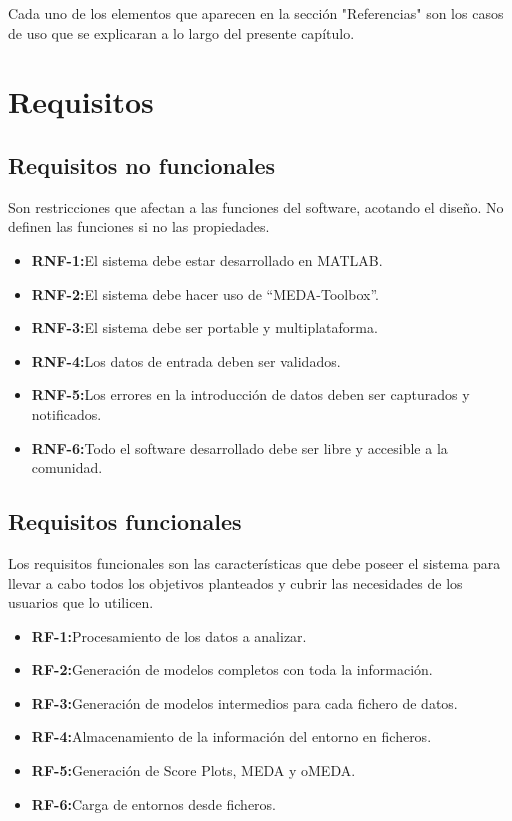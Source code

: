 \bigskip

Cada uno de los elementos que aparecen en la sección "Referencias" son los casos de uso que se explicaran a lo largo del presente capítulo.

\section{Requisitos}
\bigskip

\subsection{Requisitos no funcionales}

Son restricciones que afectan a las funciones del software, acotando el diseño. No definen las funciones si no las propiedades.

\begin{itemize}
\item \textbf{RNF-1:}El sistema debe estar desarrollado en MATLAB.
\item \textbf{RNF-2:}El sistema debe hacer uso de “MEDA-Toolbox”.
\item \textbf{RNF-3:}El sistema debe ser portable y multiplataforma.
\item \textbf{RNF-4:}Los datos de entrada deben ser validados.
\item \textbf{RNF-5:}Los errores en la introducción de datos deben ser capturados y notificados.
\item \textbf{RNF-6:}Todo el software desarrollado debe ser libre y accesible a la comunidad.
\end{itemize}

\bigskip

\subsection{Requisitos funcionales}
Los requisitos funcionales son las características que debe poseer el sistema para llevar a cabo todos los objetivos planteados y cubrir las necesidades de los usuarios que lo utilicen.

\begin{itemize}
\item \textbf{RF-1:}Procesamiento de los datos a analizar.
\item \textbf{RF-2:}Generación de modelos completos con toda la información.
\item \textbf{RF-3:}Generación de modelos intermedios para cada fichero de datos.
\item \textbf{RF-4:}Almacenamiento de la información del entorno en ficheros.
\item \textbf{RF-5:}Generación de Score Plots, MEDA y oMEDA.
\item \textbf{RF-6:}Carga de entornos desde ficheros.
\end{itemize}


